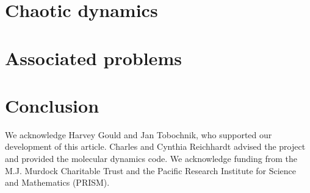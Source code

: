 \documentclass[prb,preprint]{revtex4}
\begin{document}
\section{Chaotic dynamics}
\label{sec:chaos}	%

\section{Associated problems}
\label{sec:problems}	%


\section{Conclusion}
\label{sec:conclusion}	%


\begin{acknowledgments}

  We acknowledge Harvey Gould and Jan Tobochnik, who supported our development of this article.
  Charles and Cynthia Reichhardt advised 
  the project and provided the molecular dynamics code.
  We acknowledge funding from the M.J. Murdock Charitable Trust
  and the Pacific Research Institute for Science and Mathematics (PRISM).

\end{acknowledgments}
\end{document}
